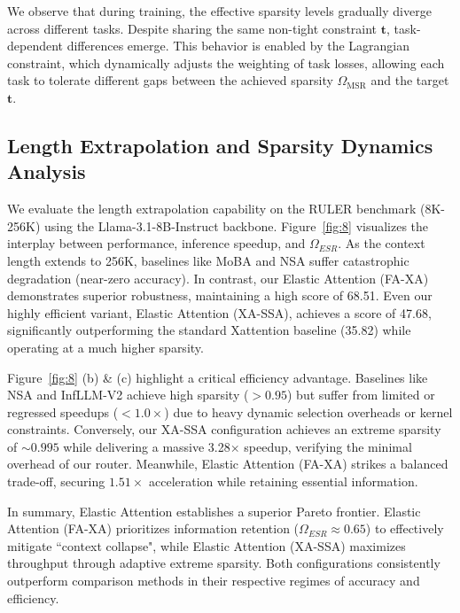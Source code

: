 We observe that during training, the effective sparsity levels gradually diverge across different tasks. Despite sharing the same non-tight constraint $\boldsymbol{t}$, task-dependent differences emerge. 
This behavior is enabled by the Lagrangian constraint, which dynamically adjusts the weighting of task losses, allowing each task to tolerate different gaps between the achieved sparsity $\Omega_{\mathrm{MSR}}$ and the target $\boldsymbol{t}$.


\subsection{Length Extrapolation and Sparsity Dynamics Analysis}
\label{appdix:length_extrapolation_and_sparsity_dynamics_analysis}
We evaluate the length extrapolation capability on the RULER benchmark (8K-256K) using the Llama-3.1-8B-Instruct backbone. Figure~\ref{fig:8} visualizes the interplay between performance, inference speedup, and $\Omega_{ESR}$. As the context length extends to 256K, baselines like MoBA and NSA suffer catastrophic degradation (near-zero accuracy). In contrast, our Elastic Attention (FA-XA) demonstrates superior robustness, maintaining a high score of 68.51. Even our highly efficient variant, Elastic Attention (XA-SSA), achieves a score of 47.68, significantly outperforming the standard Xattention baseline (35.82) while operating at a much higher sparsity.

Figure~\ref{fig:8} (b) \& (c) highlight a critical efficiency advantage. Baselines like NSA and InfLLM-V2 achieve high sparsity ($>0.95$) but suffer from limited or regressed speedups ($<1.0\times$) due to heavy dynamic selection overheads or kernel constraints. Conversely, our XA-SSA configuration achieves an extreme sparsity of $\sim 0.995$ while delivering a massive 3.28$\times$ speedup, verifying the minimal overhead of our router. Meanwhile, Elastic Attention (FA-XA) strikes a balanced trade-off, securing $1.51\times$ acceleration while retaining essential information.

In summary, Elastic Attention establishes a superior Pareto frontier. Elastic Attention (FA-XA) prioritizes information retention ($\Omega_{ESR} \approx 0.65$) to effectively mitigate ``context collapse", while Elastic Attention (XA-SSA) maximizes throughput through adaptive extreme sparsity. Both configurations consistently outperform comparison methods in their respective regimes of accuracy and efficiency.


